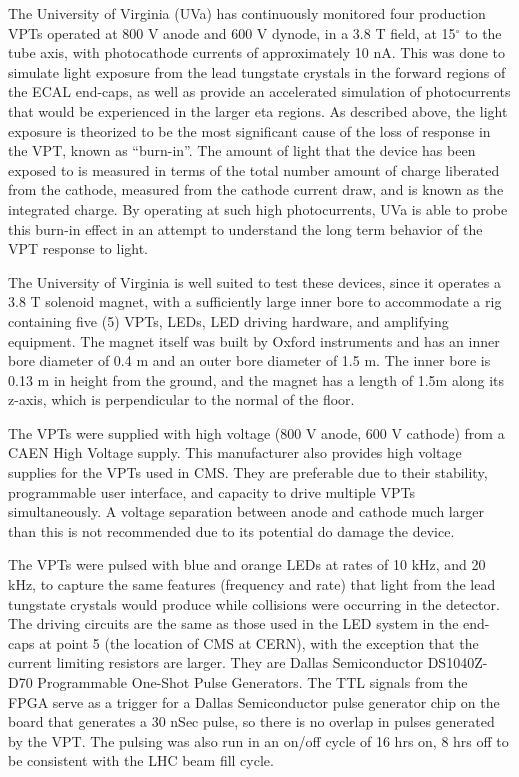 \par The University of Virginia (UVa) has continuously monitored four
production VPTs operated at 800 V anode and 600 V dynode, in a 3.8 T
field, at 15$^\circ$ to the tube axis, with photocathode currents of
approximately 10 nA.  This was done to simulate light exposure from
the lead tungstate crystals in the forward regions of the ECAL
end-caps, as well as provide an accelerated simulation of
photocurrents that would be experienced in the larger eta regions.  As
described above, the light exposure is theorized
to be the most significant cause of the loss of response in the VPT,
known as “burn-in”.  The amount of light that the device has been
exposed to is measured in terms of the total number amount of charge
liberated from the cathode, measured from the cathode current draw,
and is known as the integrated charge.  By operating at such high
photocurrents, UVa is able to probe this burn-in effect in an attempt
to understand the long term behavior of the VPT response to light.  

\par The University of Virginia is well suited to test these devices,
since it operates a 3.8 T solenoid magnet, with a sufficiently large
inner bore to accommodate a rig containing five (5) VPTs, LEDs, LED
driving hardware, and amplifying equipment.  The magnet itself was
built by Oxford instruments and has an inner bore diameter of 0.4 m
and an outer bore diameter of 1.5 m.  The inner bore is 0.13 m in
height from the ground, and the magnet has a length of 1.5m along its
z-axis, which is perpendicular to the normal of the floor. 

\par The VPTs were supplied with high voltage (800 V anode, 600 V
cathode) from a CAEN High Voltage supply.  This manufacturer also
provides high voltage supplies for the VPTs used in CMS.  They are
preferable due to their stability, programmable user interface, and
capacity to drive multiple VPTs simultaneously.  A voltage separation
between anode and cathode much larger than this is not recommended due
to its potential do damage the device.  

\par The VPTs were pulsed with blue and orange LEDs at rates of 10
kHz, and 20 kHz, to capture the same features (frequency and rate)
that light from the lead tungstate crystals would produce while
collisions were occurring in the detector.  The driving circuits are
the same as those used in the LED system in the end-caps at point 5
(the location of CMS at CERN), with the exception that the current
limiting resistors are larger.  They are Dallas Semiconductor
DS1040Z-D70 Programmable One-Shot Pulse Generators.  The TTL signals
from the FPGA serve as a trigger for a Dallas Semiconductor pulse
generator chip on the board that generates a 30 nSec pulse, so there
is no overlap in pulses generated by the VPT.  The pulsing was also
run in an on/off cycle of 16 hrs on, 8 hrs off to be consistent with
the LHC beam fill cycle.   

